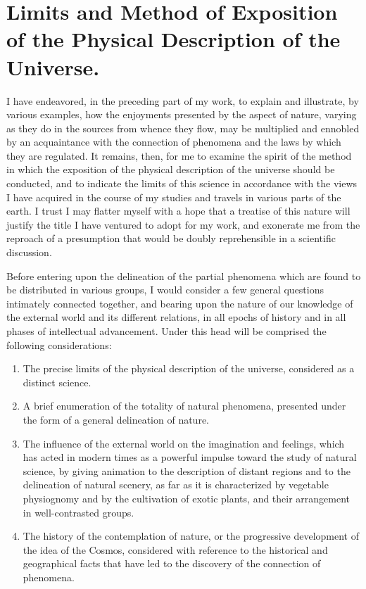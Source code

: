 \section[Limits and Method of Exposition ...]{Limits and Method of Exposition of the Physical Description of the Universe.}

I have endeavored, in the preceding part of my work, to explain and illustrate, by various examples, how the enjoyments presented by the aspect of nature, varying as they do in the sources from whence they flow, may be multiplied and ennobled by an acquaintance with the connection of phenomena and the laws by which they are regulated. It remains, then, for me to examine the spirit of the method in which the exposition of the physical description of the universe should be conducted, and to indicate the limits of this science in accordance with the views I have acquired in the course of my studies and travels in various parts of the earth. I trust I may flatter myself with a hope that a treatise of this nature will justify the title I have ventured to adopt for my work, and exonerate me from the reproach of a presumption that would be doubly reprehensible in a scientific discussion.

Before entering upon the delineation of the partial phenomena which are found to be distributed in various groups, I would consider a few general questions intimately connected together, and bearing upon the nature of our knowledge of the external world and its different relations, in all epochs of history and in all phases of intellectual advancement. Under this head will be comprised the following considerations:

\begin{enumerate}

\item The precise limits of the physical description of the universe, considered as a distinct science.

\item A brief enumeration of the totality of natural phenomena, presented under the form of a general delineation of nature.

\item The influence of the external world on the imagination and feelings, which has acted in modern times as a powerful impulse toward the study of natural science, by giving animation to the description of distant regions and to the delineation of natural scenery, as far as it is characterized by vegetable physiognomy and by the cultivation of exotic plants, and their arrangement in well-contrasted groups.

\item The history of the contemplation of nature, or the progressive development of the idea of the Cosmos, considered with reference to the historical and geographical facts that have led to the discovery of the connection of phenomena.

\end{enumerate}

